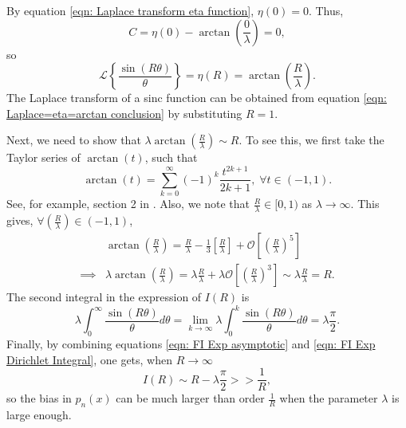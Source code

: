 \documentclass[%
 reprint,
 amsmath,amssymb,
 aps,
]{revtex4-2}
\begin{document}
By equation \eqref{eqn: Laplace transform eta function}, $\eta(0) = 0$. Thus,
\begin{equation*}
    C = \eta(0) - \arctan\left(\frac{0}{\lambda} \right) = 0,
\end{equation*}
so
\begin{equation} \label{eqn: Laplace=eta=arctan conclusion}
    \mathcal{L}\left\{\frac{\sin(R\theta)}{\theta}\right\} = \eta(R) = \arctan\left(\frac{R}{\lambda} \right).
\end{equation}
The Laplace transform of a sinc function can be obtained from equation \eqref{eqn: Laplace=eta=arctan conclusion} by substituting $R=1$.

Next, we need to show that $\lambda \arctan\left(\frac{R}{\lambda} \right) \sim R$. To see this, we first take the Taylor series of $\arctan(t)$, such that
\begin{equation*}
    \arctan(t) = \sum_{k = 0}^\infty (-1)^k \frac{t^{2k+1}}{2k+1}, \; \forall t \in (-1, 1).
\end{equation*}
See, for example, section 2 in \cite{nimbran2015taylor}. Also, we note that $\displaystyle \frac{R}{\lambda} \in [0, 1)$ as $\lambda \to \infty$. This gives, $\displaystyle \forall \left(\frac{R}{\lambda}\right) \in (-1, 1)$,
\begin{align*}
    & \arctan\left(\frac{R}{\lambda} \right)
    = \frac{R}{\lambda} - \frac{1}{3}\left[\frac{R}{\lambda} \right] + \mathcal{O}\left[\left(\frac{R}{\lambda} \right)^5 \right] \\
    \implies & \lambda \arctan\left(\frac{R}{\lambda} \right) = \lambda \frac{R}{\lambda} + \lambda \mathcal{O}\left[\left(\frac{R}{\lambda} \right)^3 \right] \sim \lambda \frac{R}{\lambda} = R.
\end{align*}
The second integral in the expression of $I(R)$ is
\begin{equation} \label{eqn: FI Exp Dirichlet Integral}
    \lambda \int_0^\infty \frac{\sin(R\theta)}{\theta} d\theta = \lim_{k \to \infty} \lambda \int_0^k \frac{\sin(R\theta)}{\theta} d\theta = \lambda\frac{\pi}{2}.
\end{equation}
 Finally, by combining equations \eqref{eqn: FI Exp asymptotic} and \eqref{eqn: FI Exp Dirichlet Integral}, one gets, when $R \to \infty$
\begin{equation} \label{eqn: FI Exp bias I component}
    I(R) \sim R - \lambda \frac{\pi}{2} >> \frac{1}{R},
\end{equation}
so the bias in $\hat{p}_n(x)$ can be much larger than order $\frac{1}{R}$ when the parameter $\lambda$ is large enough. 
\end{document}

